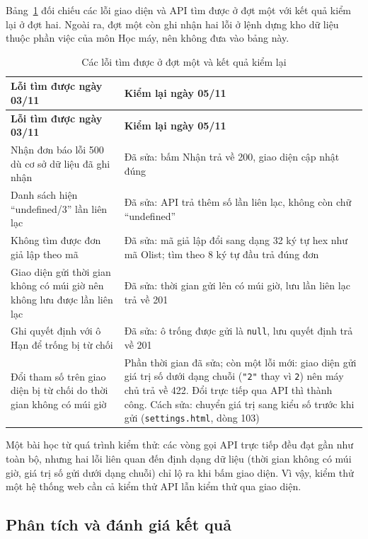 Bảng~\ref{tab:loi} đối chiếu các lỗi giao diện và API tìm được ở đợt một với kết quả kiểm lại ở đợt
hai. Ngoài ra, đợt một còn ghi nhận hai lỗi ở lệnh dựng kho dữ liệu thuộc phần việc của môn Học máy,
nên không đưa vào bảng này.

{\small
\renewcommand{\arraystretch}{1.25}
\begin{longtable}{|>{\raggedright\arraybackslash}p{6.6cm}|>{\raggedright\arraybackslash}p{8.2cm}|}
\caption{Các lỗi tìm được ở đợt một và kết quả kiểm lại}\label{tab:loi}\\ \hline
\textbf{Lỗi tìm được ngày 03/11} & \textbf{Kiểm lại ngày 05/11} \\ \hline \endfirsthead
\hline \textbf{Lỗi tìm được ngày 03/11} & \textbf{Kiểm lại ngày 05/11} \\ \hline \endhead
Nhận đơn báo lỗi 500 dù cơ sở dữ liệu đã ghi nhận & Đã sửa: bấm Nhận trả về 200, giao diện cập nhật đúng \\ \hline
Danh sách hiện ``undefined/3'' lần liên lạc & Đã sửa: API trả thêm số lần liên lạc, không còn chữ ``undefined'' \\ \hline
Không tìm được đơn giả lập theo mã & Đã sửa: mã giả lập đổi sang dạng 32 ký tự hex như mã Olist; tìm theo 8 ký tự đầu trả đúng đơn \\ \hline
Giao diện gửi thời gian không có múi giờ nên không lưu được lần liên lạc & Đã sửa: thời gian gửi lên có múi giờ, lưu lần liên lạc trả về 201 \\ \hline
Ghi quyết định với ô Hạn để trống bị từ chối & Đã sửa: ô trống được gửi là \texttt{null}, lưu quyết định trả về 201 \\ \hline
Đổi tham số trên giao diện bị từ chối do thời gian không có múi giờ & Phần thời gian đã sửa; còn một lỗi mới: giao diện gửi giá trị số dưới dạng chuỗi (\texttt{"2"} thay vì \texttt{2}) nên máy chủ trả về 422. Đổi trực tiếp qua API thì thành công. Cách sửa: chuyển giá trị sang kiểu số trước khi gửi (\texttt{settings.html}, dòng 103) \\ \hline
\end{longtable}
}

Một bài học từ quá trình kiểm thử: các vòng gọi API trực tiếp đều đạt gần như toàn bộ, nhưng hai lỗi
liên quan đến định dạng dữ liệu (thời gian không có múi giờ, giá trị số gửi dưới dạng chuỗi) chỉ lộ ra
khi bấm giao diện. Vì vậy, kiểm thử một hệ thống web cần cả kiểm thử API lẫn kiểm thử qua giao diện.

\subsection{Phân tích và đánh giá kết quả}

